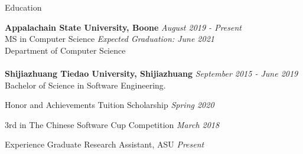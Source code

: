 \documentclass{resume} %
\begin{document}

\begin{rSection}{Education}

{\bf Appalachain State University, Boone} \hfill {\em August 2019 - Present} 
\\ MS in Computer Science \hfill {\em Expected Graduation: June 2021}
\\ Department of Computer Science\\
\\{\bf Shijiazhuang Tiedao University, Shijiazhuang} \hfill {\em September 2015 - June 2019} 
\\ Bachelor of Science in Software Engineering.\hfill
\end{rSection}


\begin{rSection}{Honor and Achievements} 
 Tuition Scholarship \hfill {\em Spring 2020}
\item 3rd in The Chinese Software Cup Competition \hfill {\em March 2018}
\end{rSection}

\begin{rSection}{Experience} 
 Graduate Research Assistant, ASU \hfill {\em Present}
\end{rSection}
\end{document}
